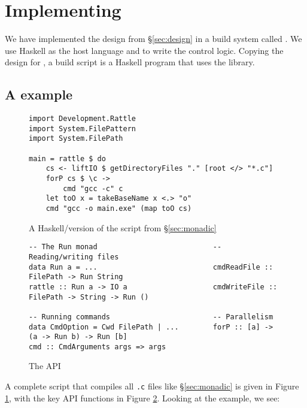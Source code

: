 \section{Implementing \Rattle}
\label{sec:implementation}

We have implemented the design from \S\ref{sec:design} in a build system called \Rattle. We use Haskell as the host language and to write the control logic. Copying the design for \Shake \cite{shake}, a \Rattle build script is a Haskell program that uses the \Rattle library.

\subsection{A \Rattle example}

\begin{figure}
  \begin{small}
\begin{verbatim}
import Development.Rattle
import System.FilePattern
import System.FilePath

main = rattle $ do
    cs <- liftIO $ getDirectoryFiles "." [root </> "*.c"]
    forP cs $ \c ->
        cmd "gcc -c" c
    let toO x = takeBaseName x <.> "o"
    cmd "gcc -o main.exe" (map toO cs)
\end{verbatim}
\end{small}
\caption{A Haskell/\Rattle version of the script from \S\ref{sec:monadic}}
\label{fig:rattle_example}
\end{figure}

\begin{figure}
\begin{small}
\begin{verbatim}
-- The Run monad                           -- Reading/writing files
data Run a = ...                           cmdReadFile :: FilePath -> Run String
rattle :: Run a -> IO a                    cmdWriteFile :: FilePath -> String -> Run ()

-- Running commands                        -- Parallelism
data CmdOption = Cwd FilePath | ...        forP :: [a] -> (a -> Run b) -> Run [b]
cmd :: CmdArguments args => args
\end{verbatim}
\end{small}
\caption{The \Rattle API}
\label{fig:api}
\end{figure}

A complete \Rattle script that compiles all \texttt{.c} files like \S\ref{sec:monadic} is given in Figure \ref{fig:rattle_example}, with the key API functions in Figure \ref{fig:api}. Looking at the example, we see:

